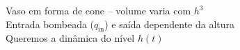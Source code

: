 \documentclass[preview]{standalone}
\begin{document}
Vaso em forma de cone -- volume varia com \(h^{3}\)\\Entrada bombeada (\(q_{\text{in}}\)) e saída dependente da altura\\Queremos a dinâmica do nível \(h(t)\)\\
\end{document}
